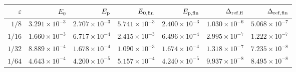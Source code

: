 \begin{tabular}{rrrrrrr}
\hline
$\varepsilon$ & $E_0$ & $E_{\rm p}$
& $E_{0,\rm fin}$ & $E_{{\rm p},\rm fin}$
& $\Delta_{\rm ref,fl}$ & $\Delta_{\rm ref,fin}$\\
\hline
$1/8$
& $3.291\times10^{-3}$ & $2.707\times10^{-3}$
& $5.741\times10^{-3}$ & $2.400\times10^{-3}$
& $1.030\times10^{-6}$ & $5.068\times10^{-7}$\\
$1/16$
& $1.660\times10^{-3}$ & $6.717\times10^{-4}$
& $2.415\times10^{-3}$ & $6.496\times10^{-4}$
& $2.995\times10^{-7}$ & $1.222\times10^{-7}$\\
$1/32$
& $8.889\times10^{-4}$ & $1.678\times10^{-4}$
& $1.090\times10^{-3}$ & $1.674\times10^{-4}$
& $1.318\times10^{-7}$ & $7.235\times10^{-8}$\\
$1/64$
& $4.643\times10^{-4}$ & $4.200\times10^{-5}$
& $5.157\times10^{-4}$ & $4.240\times10^{-5}$
& $9.937\times10^{-8}$ & $8.495\times10^{-8}$\\
\hline
\end{tabular}
